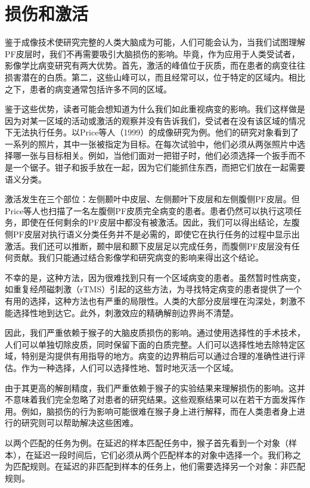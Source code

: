 \section{损伤和激活}
鉴于成像技术使研究完整的人类大脑成为可能，人们可能会认为，当我们试图理解PF皮层时，我们不再需要吸引大脑损伤的影响。毕竟，作为应用于人类受试者，影像学比病变研究有两大优势。首先，激活的峰值位于灰质，而在患者的病变往往损害潜在的白质。第二，这些山峰可以，而且经常可以，位于特定的区域内。相比之下，患者的病变通常包括许多不同的区域。
\par
鉴于这些优势，读者可能会想知道为什么我们如此重视病变的影响。我们这样做是因为对某一区域的活动或激活的观察并没有告诉我们，受试者在没有该区域的情况下无法执行任务。以Price等人（1999）的成像研究为例。他们的研究对象看到了一系列的照片，其中一张被指定为目标。在每次试验中，他们必须从两张照片中选择哪一张与目标相关。例如，当他们面对一把钳子时，他们必须选择一个扳手而不是一个锯子。钳子和扳手放在一起，因为它们能抓住东西，而把它们放在一起需要语义分类。
\par
激活发生在三个部位：左侧颞叶中皮层、左侧颞叶下皮层和左侧腹侧PF皮层。但Price等人也扫描了一名左腹侧PF皮质完全病变的患者。患者仍然可以执行这项任务，即使在任何剩余的PF皮层中都没有被激活。因此，我们可以得出结论，左腹侧PF皮层对执行语义分类任务并不是必需的，即使它在执行任务的过程中显示出激活。我们还可以推断，颞中层和颞下皮层足以完成任务，而腹侧PF皮层没有任何贡献。我们只能通过结合影像学和研究病变的影响来得出这个结论。
\par
不幸的是，这种方法，因为很难找到只有一个区域病变的患者。虽然暂时性病变，如重复经颅磁刺激（rTMS）引起的这些方法，为寻找特定病变的患者提供了一个有用的选择，这种方法也有严重的局限性。人类的大部分皮层埋在沟深处，刺激不能选择性地到达它。此外，刺激效应的精确解剖边界尚不清楚。
\par
因此，我们严重依赖于猴子的大脑皮质损伤的影响。通过使用选择性的手术技术，人们可以单独切除皮质，同时保留下面的白质完整。人们可以选择性地去除特定区域，特别是沟提供有用指导的地方。病变的边界稍后可以通过合理的准确性进行评估。作为一种选择，人们可以选择性地、暂时地灭活一个区域。
\par
由于其更高的解剖精度，我们严重依赖于猴子的实验结果来理解损伤的影响。这并不意味着我们完全忽略了对患者的研究结果。这些观察结果可以在若干方面发挥作用。例如，脑损伤的行为影响可能很难在猴子身上进行解释，而在人类患者身上进行的研究则可以帮助解决这些困难。
\par
以两个匹配的任务为例。在延迟的样本匹配任务中，猴子首先看到一个对象（样本），在延迟一段时间后，它们必须从两个匹配样本的对象中选择一个。我们称之为匹配规则。在延迟的非匹配到样本的任务上，他们需要选择另一个对象：非匹配规则。
